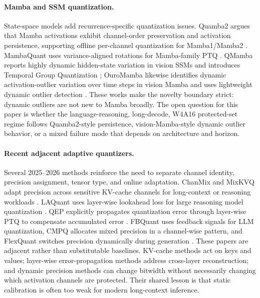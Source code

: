 \paragraph{Mamba and SSM quantization.}
State-space models add recurrence-specific quantization issues.  Quamba2
argues that Mamba activations exhibit channel-order preservation and
activation persistence, supporting offline per-channel quantization for
Mamba1/Mamba2 \citep{chiang2025quamba2}.  MambaQuant uses
variance-aligned rotations for Mamba-family PTQ \citep{xu2025mambaquant}.
QMamba reports highly dynamic hidden-state variation in vision SSMs and
introduces Temporal Group Quantization \citep{li2025qmamba}; OuroMamba
likewise identifies dynamic activation-outlier variation over time steps in
vision Mamba and uses lightweight dynamic outlier detection
\citep{ramachandran2025ouromamba}.  These works make the novelty boundary
strict: dynamic outliers are not new to Mamba broadly.  The open question for
this paper is whether the language-reasoning, long-decode, W4A16 protected-set
regime follows Quamba2-style persistence, vision-Mamba-style dynamic outlier
behavior, or a mixed failure mode that depends on architecture and horizon.

\paragraph{Recent adjacent adaptive quantizers.}
Several 2025--2026 methods reinforce the need to separate channel identity,
precision assignment, tensor type, and online adaptation.  ChanMix and MixKVQ
adapt precision across sensitive KV-cache channels for long-context or
reasoning workloads \citep{wen2026chanmix,zhang2025mixkvq}.  LAQuant uses
layer-wise lookahead loss for large reasoning model quantization
\citep{choi2026laquant}.  QEP explicitly propagates quantization error through
layer-wise PTQ to compensate accumulated error \citep{arai2025qep}.  FBQuant
uses feedback signals for LLM quantization, CMPQ allocates mixed precision in
a channel-wise pattern, and FlexQuant switches precision dynamically during
generation \citep{liu2025fbquant,chen2024cmpq,liu2025flexquant}.
These papers are adjacent rather than substitutable baselines.  KV-cache
methods act on keys and values; layer-wise error-propagation methods address
cross-layer reconstruction; and dynamic precision methods can change bitwidth
without necessarily changing which activation channels are protected.  Their
shared lesson is that static calibration is often too weak for modern
long-context inference.

